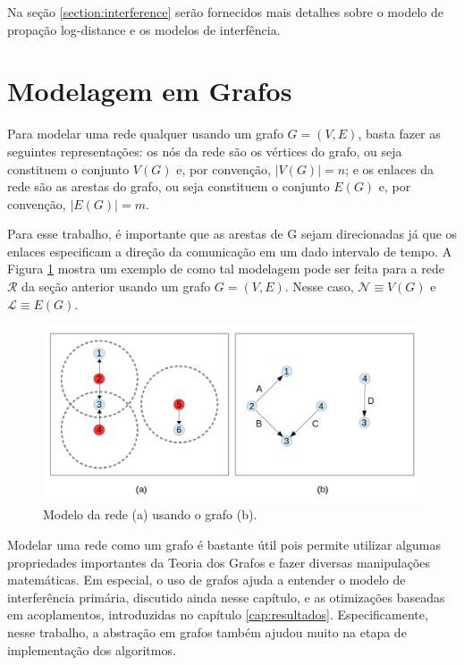 Na seção \ref{section:interference} serão fornecidos mais detalhes sobre o modelo de propação log-distance e os modelos de interfência.

\section{Modelagem em Grafos}
\label{section:graphs}

Para modelar uma rede qualquer usando um grafo $G=(V,E)$, basta fazer as seguintes representações: os nós da rede são os vértices do grafo, ou seja constituem o conjunto $V(G)$ e, por convenção, $|V(G)|=n$; e os enlaces da rede são as arestas do grafo, ou seja constituem o conjunto $E(G)$ e, por convenção, $|E(G)|=m$.

Para esse trabalho, é importante que as arestas de G sejam direcionadas já que os enlaces especificam a direção da comunicação em um dado intervalo de tempo. A Figura \ref{fig:grafo} mostra um exemplo de como tal modelagem pode ser feita para a rede $\mathcal{R}$ da seção anterior usando um grafo $G=(V,E)$. Nesse caso, $\mathcal{N} \equiv V(G)$ e $\mathcal{L} \equiv E(G)$.

\begin{figure}[htb]
\centering
\includegraphics[width=1\textwidth]{figs/grafo}
\caption[Modelo da rede (a) usando o grafo (b).]
{Modelo da rede (a) usando o grafo (b).}
\label{fig:grafo}
\end{figure}

Modelar uma rede como um grafo é bastante útil pois permite utilizar algumas propriedades importantes da Teoria dos Grafos e fazer diversas manipulações matemáticas. Em especial, o uso de grafos ajuda a entender o modelo de interferência primária, discutido ainda nesse capítulo, e as otimizações baseadas em acoplamentos, introduzidas no capítulo \ref{cap:resultados}. Especificamente, nesse trabalho, a abstração em grafos também ajudou muito na etapa de implementação dos algoritmos.

